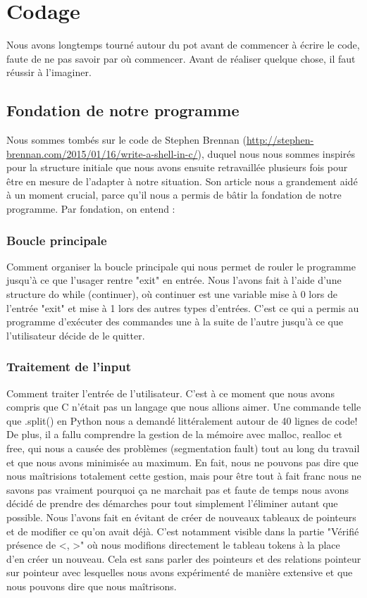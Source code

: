 \documentclass{article}
\begin{document}
\section{Codage}
Nous avons longtemps tourné autour du pot avant de commencer à écrire le code, faute de ne pas savoir par où commencer. Avant de réaliser quelque chose, il faut réussir à l’imaginer. 

\subsection{Fondation de notre programme}

Nous sommes tombés sur le code de Stephen Brennan  (\url{http://stephen-brennan.com/2015/01/16/write-a-shell-in-c/}), duquel nous nous sommes inspirés pour la structure initiale que nous avons ensuite retravaillée plusieurs fois pour être en mesure de l’adapter à notre situation. Son article nous a grandement aidé à un moment crucial, parce qu’il nous a permis de bâtir la fondation de notre programme. Par fondation, on entend :
\subsubsection{Boucle principale}
Comment organiser la boucle principale qui nous permet de rouler le programme jusqu’à ce que l'usager rentre "exit" en entrée. Nous l’avons fait à l’aide d’une structure do while (continuer), où continuer est une variable mise à 0 lors de l’entrée "exit" et mise à 1 lors des autres types d’entrées. C'est ce qui a permis au programme d’exécuter des commandes une à la suite de l’autre jusqu’à ce que l’utilisateur décide de le quitter.

\subsubsection{Traitement de l'input} 
Comment traiter l’entrée de l’utilisateur. C’est à ce moment que nous avons compris que C n’était pas un langage que nous allions aimer. Une commande telle que .split() en Python nous a demandé littéralement autour de 40 lignes de code! De plus, il a fallu comprendre la gestion de la mémoire avec malloc, realloc et free, qui nous a causée des problèmes (segmentation fault) tout au long du travail et que nous avons minimisée au maximum. En fait, nous ne pouvons pas dire que nous maîtrisions totalement cette gestion, mais pour être tout à fait franc nous ne savons pas vraiment pourquoi ça ne marchait pas et faute de temps nous avons décidé de prendre des démarches pour tout simplement l’éliminer autant que possible. Nous l’avons fait en évitant de créer de nouveaux tableaux de pointeurs et de modifier ce qu’on avait déjà. C’est notamment visible dans la partie  "Vérifié présence de \textless , \textgreater" où nous modifions directement le tableau tokens à la place d’en créer un nouveau. Cela est sans parler des pointeurs et des relations pointeur sur pointeur avec lesquelles nous avons expérimenté de manière extensive et que nous pouvons dire que nous maîtrisons. 
\end{document}
